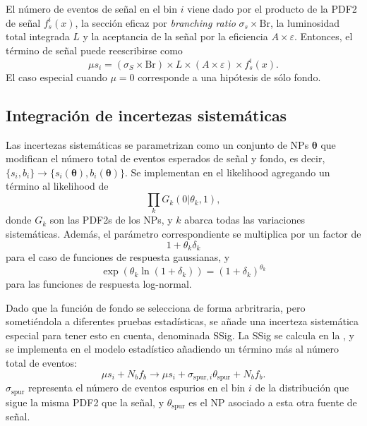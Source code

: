 El número de eventos de señal en el bin \(i\) viene dado por el producto de la \ac{PDF2} de señal \(f_s^i(x)\), la sección eficaz por \textit{branching ratio} \(\sigma_s \times \text{Br}\), la luminosidad total integrada \(L\) y la aceptancia de la señal por la eficiencia \(A \times \varepsilon\). Entonces, el término de señal puede reescribirse como
\begin{equation}
    \label{eq:strategy:stat_treatment:stat_model:mu_si}
    \mu s_i = \left(\sigma_S \times \text{Br} \right) \times L \times \left(A \times \varepsilon\right) \times f_s^i(x).
\end{equation}
El caso especial cuando \(\mu = 0\) corresponde a una hipótesis de sólo fondo.



\subsection{Integraci\'on de incertezas sistem\'aticas}
\label{subsec:strategy:stat_treatment:systs}

Las incertezas sistemáticas se parametrizan como un conjunto de \acp{NP} \(\mathbf{\theta}\) que modifican el n\'umero total de eventos esperados de señal y fondo, es decir, \(\{s_i, b_i\} \to \{s_i(\mathbf{\theta}), b_i(\mathbf{\theta})\}\). Se implementan en el likelihood agregando un t\'ermino al likelihood de
\begin{equation}
    \prod_{k} G_k(0 | \theta_k, 1),
\end{equation}
donde \(G_k\) son las \acp{PDF2} de los \acp{NP}, y \(k\) abarca todas las variaciones sistemáticas. Además, el parámetro correspondiente se multiplica por un factor de
\begin{equation}
    1 + \theta_k \delta_k
\end{equation}
para el caso de funciones de respuesta gaussianas, y
\begin{equation}
    \exp\left( \theta_k \ln\left(1 + \delta_k\right) \right) = \left(1 + \delta_k\right)^{\theta_k}
\end{equation}
para las funciones de respuesta log-normal.

Dado que la función de fondo se selecciona de forma arbritraria, pero sometiéndola a diferentes pruebas estadísticas, se añade una incerteza sistemática especial para tener esto en cuenta, denominada \acf{SSig}. La \ac{SSig} se calcula en la \Sect{\ref{subsubsec:bkg:modeling:sigbkg:sstest}}, y se implementa en el modelo estadístico añadiendo un término más al número total de eventos:
\begin{equation}
    \mu s_i + N_b f_b \to \mu s_i + \sigma_{\text{spur}, i} \theta_{\text{spur}} + N_b f_b.
\end{equation}
\(\sigma_{\text{spur}}\) representa el número de eventos espurios en el bin \(i\) de la distribución que sigue la misma \ac{PDF2} que la señal, y \(\theta_{\text{spur}}\) es el \ac{NP} asociado a esta otra fuente de señal.

